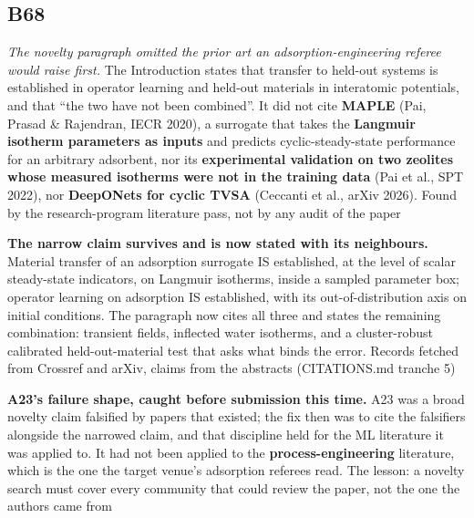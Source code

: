 \documentclass[10pt]{article}
\begin{document}
\subsection*{B68}\label{led:B68}
\begin{description}[leftmargin=0pt,itemsep=1pt]
\item[Defect.] \emph{The novelty paragraph omitted the prior art an adsorption-engineering referee would raise first.} The Introduction states that transfer to held-out systems is established in operator learning and held-out materials in interatomic potentials, and that ``the two have not been combined''. It did not cite \textbf{MAPLE} (Pai, Prasad \& Rajendran, IECR 2020), a surrogate that takes the \textbf{Langmuir isotherm parameters as inputs} and predicts cyclic-steady-state performance for an arbitrary adsorbent, nor its \textbf{experimental validation on two zeolites whose measured isotherms were not in the training data} (Pai et al., SPT 2022), nor \textbf{DeepONets for cyclic TVSA} (Ceccanti et al., arXiv 2026). Found by the research-program literature pass, not by any audit of the paper
\item[Resolution.] \textbf{The narrow claim survives and is now stated with its neighbours.} Material transfer of an adsorption surrogate IS established, at the level of scalar steady-state indicators, on Langmuir isotherms, inside a sampled parameter box; operator learning on adsorption IS established, with its out-of-distribution axis on initial conditions. The paragraph now cites all three and states the remaining combination: transient fields, inflected water isotherms, and a cluster-robust calibrated held-out-material test that asks what binds the error. Records fetched from Crossref and arXiv, claims from the abstracts (CITATIONS.md tranche 5)
\item[Note.] \textbf{A23's failure shape, caught before submission this time.} A23 was a broad novelty claim falsified by papers that existed; the fix then was to cite the falsifiers alongside the narrowed claim, and that discipline held for the ML literature it was applied to. It had not been applied to the \textbf{process-engineering} literature, which is the one the target venue's adsorption referees read. The lesson: a novelty search must cover every community that could review the paper, not the one the authors came from
\end{description}
\end{document}
